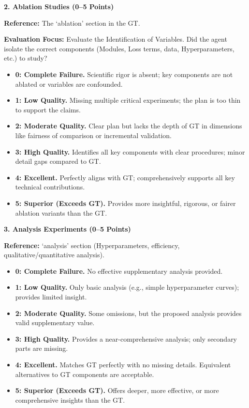 \begin{tcolorbox}[
	title={Box 7: Full Evaluation Prompt},
	colback=blue!3!white,
	colframe=blue!30!black,
	colbacktitle=blue!15!white,
	coltitle=black,
	fonttitle=\bfseries,
	arc=3mm,
	boxrule=0.8pt,
	breakable
]
\medskip
\textbf{2. Ablation Studies (0--5 Points)}

\textbf{Reference:} The `ablation' section in the GT.

\textbf{Evaluation Focus:} Evaluate the Identification of Variables. Did the agent isolate the correct components (Modules, Loss terms, data, Hyperparameters, etc.) to study?

\begin{itemize}[nosep,leftmargin=12pt]
	\item \textbf{0: Complete Failure.} Scientific rigor is absent; key components are not ablated or variables are confounded.
	\item \textbf{1: Low Quality.} Missing multiple critical experiments; the plan is too thin to support the claims.
	\item \textbf{2: Moderate Quality.} Clear plan but lacks the depth of GT in dimensions like fairness of comparison or incremental validation.
	\item \textbf{3: High Quality.} Identifies all key components with clear procedures; minor detail gaps compared to GT.
	\item \textbf{4: Excellent.} Perfectly aligns with GT; comprehensively supports all key technical contributions.
	\item \textbf{5: Superior (Exceeds GT).} Provides more insightful, rigorous, or fairer ablation variants than the GT.
\end{itemize}

\medskip
\textbf{3. Analysis Experiments (0--5 Points)}

\textbf{Reference:} `analysis' section (Hyperparameters, efficiency, qualitative/quantitative analysis).

\begin{itemize}[nosep,leftmargin=12pt]
	\item \textbf{0: Complete Failure.} No effective supplementary analysis provided.
	\item \textbf{1: Low Quality.} Only basic analysis (e.g., simple hyperparameter curves); provides limited insight.
	\item \textbf{2: Moderate Quality.} Some omissions, but the proposed analysis provides valid supplementary value.
	\item \textbf{3: High Quality.} Provides a near-comprehensive analysis; only secondary parts are missing.
	\item \textbf{4: Excellent.} Matches GT perfectly with no missing details. Equivalent alternatives to GT components are acceptable.
	\item \textbf{5: Superior (Exceeds GT).} Offers deeper, more effective, or more comprehensive insights than the GT.
\end{itemize}


\end{tcolorbox}
